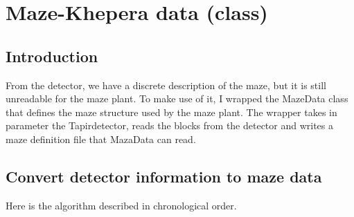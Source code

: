 \section{Maze-Khepera data (class)}
\label{sec:mkd}

\subsection{Introduction}
\label{sec:mkd:intro}

From the detector, we have a discrete description of the maze, but it 
is still unreadable for the maze plant. To make use of it, I wrapped 
the MazeData class that defines the maze structure used by the maze 
plant. The wrapper takes in parameter the Tapirdetector, reads the blocks 
from the detector and writes a maze definition file that MazaData 
can read.

\subsection{Convert detector information to maze data}
\label{sec:mkd:algo}
Here is the algorithm described in chronological order.



